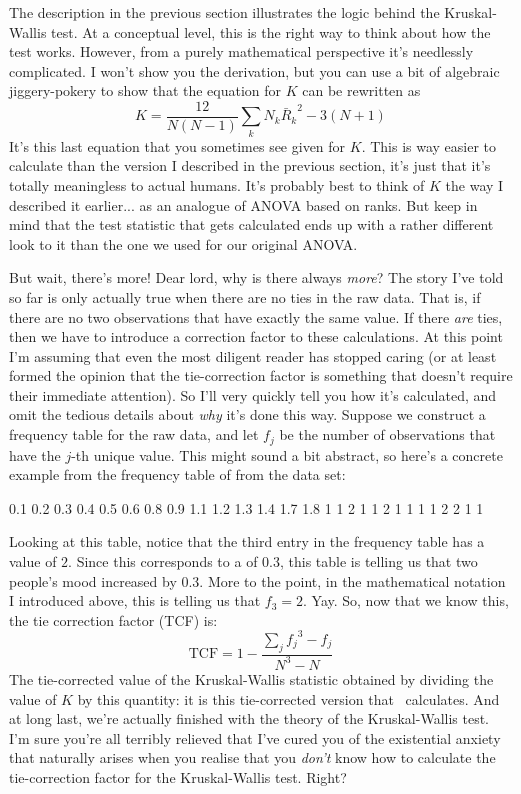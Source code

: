 
The description in the previous section illustrates the logic behind the Kruskal-Wallis test. At a conceptual level, this is the right way to think about how the test works. However, from a purely mathematical perspective it's needlessly complicated. I won't show you the derivation, but you can use a bit of algebraic jiggery-pokery to show that the equation for $K$ can be rewritten as 
$$
K = \frac{12}{N(N-1)} \sum_k N_k {\bar{R}_k}^2    -  3(N+1)
$$
It's this last equation that you sometimes see given for $K$. This is way easier to calculate than the version I described in the previous section, it's just that it's totally meaningless to actual humans. It's probably best to think of $K$ the way I described it earlier... as an analogue of ANOVA based on ranks. But keep in mind that the test statistic that gets calculated ends up with a rather different look to it than the one we used for our original ANOVA.

But wait, there's more! Dear lord, why is there always {\it more}? The story I've told so far is only actually true when there are no ties in the raw data. That is, if there are no two observations that have exactly the same value. If there {\it are} ties, then we have to introduce a correction factor to these calculations. At this point I'm assuming that even the most diligent reader has stopped caring (or at least formed the opinion that the tie-correction factor is something that doesn't require their immediate attention). So I'll very quickly tell you how it's calculated, and omit the tedious details about {\it why} it's done this way. Suppose we construct a frequency table for the raw data, and let $f_j$ be the number of observations that have the $j$-th unique value. This might sound a bit abstract, so here's a concrete example from the frequency table of  from the  data set:

\begin{rblock1}
0.1 0.2 0.3 0.4 0.5 0.6 0.8 0.9 1.1 1.2 1.3 1.4 1.7 1.8 
  1   1   2   1   1   2   1   1   1   1   2   2   1   1 
\end{rblock1}
Looking at this table, notice that the third entry in the frequency table has a value of $2$. Since this corresponds to a  of 0.3, this table is telling us that two people's mood increased by 0.3. More to the point, in the mathematical notation I introduced above, this is telling us that $f_3 = 2$. Yay. So, now that we know this, the tie correction factor (TCF) is:
$$
\mbox{TCF} = 1 - \frac{\sum_j {f_j}^3 - f_j}{N^3 - N} 
$$
The tie-corrected value of the Kruskal-Wallis statistic obtained by dividing the value of $K$ by this quantity: it is this tie-corrected version that \R\ calculates. And at long last, we're actually finished with the theory of the Kruskal-Wallis test. I'm sure you're all terribly relieved that I've cured you of the existential anxiety that naturally arises when you realise that you {\it don't} know how to calculate the tie-correction factor for the Kruskal-Wallis test. Right?


